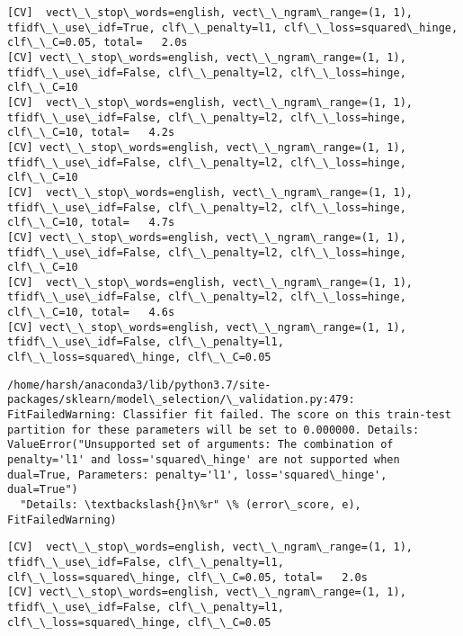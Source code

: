 \documentclass[11pt]{article}
\begin{document}
    \begin{Verbatim}[commandchars=\\\{\}]
[CV]  vect\_\_stop\_words=english, vect\_\_ngram\_range=(1, 1), tfidf\_\_use\_idf=True, clf\_\_penalty=l1, clf\_\_loss=squared\_hinge, clf\_\_C=0.05, total=   2.0s
[CV] vect\_\_stop\_words=english, vect\_\_ngram\_range=(1, 1), tfidf\_\_use\_idf=False, clf\_\_penalty=l2, clf\_\_loss=hinge, clf\_\_C=10 
[CV]  vect\_\_stop\_words=english, vect\_\_ngram\_range=(1, 1), tfidf\_\_use\_idf=False, clf\_\_penalty=l2, clf\_\_loss=hinge, clf\_\_C=10, total=   4.2s
[CV] vect\_\_stop\_words=english, vect\_\_ngram\_range=(1, 1), tfidf\_\_use\_idf=False, clf\_\_penalty=l2, clf\_\_loss=hinge, clf\_\_C=10 
[CV]  vect\_\_stop\_words=english, vect\_\_ngram\_range=(1, 1), tfidf\_\_use\_idf=False, clf\_\_penalty=l2, clf\_\_loss=hinge, clf\_\_C=10, total=   4.7s
[CV] vect\_\_stop\_words=english, vect\_\_ngram\_range=(1, 1), tfidf\_\_use\_idf=False, clf\_\_penalty=l2, clf\_\_loss=hinge, clf\_\_C=10 
[CV]  vect\_\_stop\_words=english, vect\_\_ngram\_range=(1, 1), tfidf\_\_use\_idf=False, clf\_\_penalty=l2, clf\_\_loss=hinge, clf\_\_C=10, total=   4.6s
[CV] vect\_\_stop\_words=english, vect\_\_ngram\_range=(1, 1), tfidf\_\_use\_idf=False, clf\_\_penalty=l1, clf\_\_loss=squared\_hinge, clf\_\_C=0.05 

    \end{Verbatim}

    \begin{Verbatim}[commandchars=\\\{\}]
/home/harsh/anaconda3/lib/python3.7/site-packages/sklearn/model\_selection/\_validation.py:479: FitFailedWarning: Classifier fit failed. The score on this train-test partition for these parameters will be set to 0.000000. Details: 
ValueError("Unsupported set of arguments: The combination of penalty='l1' and loss='squared\_hinge' are not supported when dual=True, Parameters: penalty='l1', loss='squared\_hinge', dual=True")
  "Details: \textbackslash{}n\%r" \% (error\_score, e), FitFailedWarning)

    \end{Verbatim}

    \begin{Verbatim}[commandchars=\\\{\}]
[CV]  vect\_\_stop\_words=english, vect\_\_ngram\_range=(1, 1), tfidf\_\_use\_idf=False, clf\_\_penalty=l1, clf\_\_loss=squared\_hinge, clf\_\_C=0.05, total=   2.0s
[CV] vect\_\_stop\_words=english, vect\_\_ngram\_range=(1, 1), tfidf\_\_use\_idf=False, clf\_\_penalty=l1, clf\_\_loss=squared\_hinge, clf\_\_C=0.05 

    \end{Verbatim}
\end{document}
